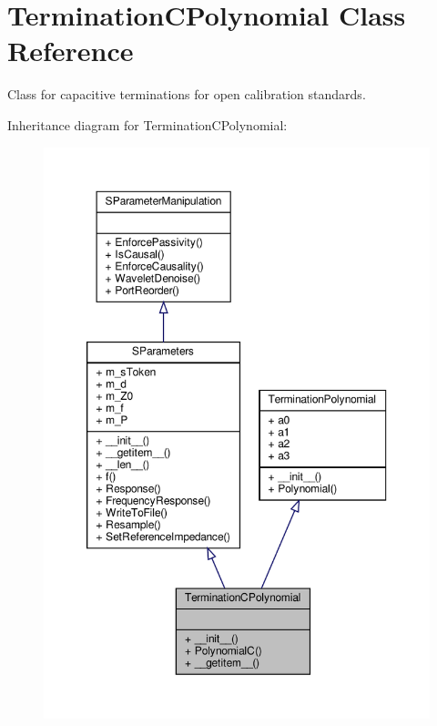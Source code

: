\hypertarget{classSignalIntegrity_1_1Measurement_1_1CalKit_1_1Standards_1_1TerminationPolynomial_1_1TerminationCPolynomial}{}\section{Termination\+C\+Polynomial Class Reference}
\label{classSignalIntegrity_1_1Measurement_1_1CalKit_1_1Standards_1_1TerminationPolynomial_1_1TerminationCPolynomial}


Class for capacitive terminations for open calibration standards.  




Inheritance diagram for Termination\+C\+Polynomial\+:
\nopagebreak
\begin{figure}[H]
\begin{center}
\leavevmode
\includegraphics[width=350pt]{classSignalIntegrity_1_1Measurement_1_1CalKit_1_1Standards_1_1TerminationPolynomial_1_1TerminationCPolynomial__inherit__graph}
\end{center}
\end{figure}


